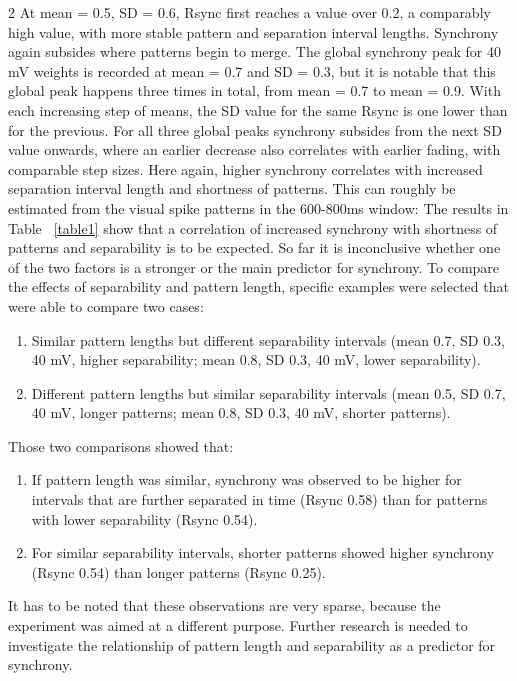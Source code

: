 \documentclass[12pt,a4paper]{article}
\begin{document}
\begin{multicols}{2}
            At mean = 0.5, SD = 0.6, Rsync first reaches a value over 0.2, a comparably high value, with more stable pattern and separation interval lengths. Synchrony again subsides where patterns begin to merge. The global synchrony peak for 40 mV weights is recorded at mean = 0.7 and SD = 0.3, but it is notable that this global peak happens three times in total, from mean = 0.7 to mean = 0.9. With each increasing step of means, the SD value for the same Rsync is one lower than for the previous. For all three global peaks synchrony subsides from the next SD value onwards, where an earlier decrease also correlates with earlier fading, with comparable step sizes. Here again, higher synchrony correlates with increased separation interval length and shortness of patterns. This can roughly be estimated from the visual spike patterns in the 600-800ms window: The results in Table ~\ref{table1} show that a correlation of increased synchrony with shortness of patterns and separability is to be expected. So far it is inconclusive whether one of the two factors is a stronger or the main predictor for synchrony. To compare the effects of separability and pattern length, specific examples were selected that were able to compare two cases:
            \begin{enumerate}[label=(\arabic*), leftmargin=*, rightmargin=1em, itemsep=10pt, parsep=0pt, topsep=10pt, partopsep=0pt]
                \item\label{diffsep} Similar pattern lengths but different separability intervals (mean 0.7, SD 0.3, 40 mV, higher separability; mean 0.8, SD 0.3, 40 mV, lower separability).
                \item\label{diffpattern} Different pattern lengths but similar separability intervals (mean 0.5, SD 0.7, 40 mV, longer patterns; mean 0.8, SD 0.3, 40 mV, shorter patterns).
            \end{enumerate}
            Those two comparisons showed that:
            \begin{enumerate}[label=(\arabic*), leftmargin=*, rightmargin=1em, itemsep=10pt, parsep=0pt, topsep=10pt, partopsep=0pt]
                \item[\ref{diffsep}]If pattern length was similar, synchrony was observed to be higher for intervals that are further separated in time (Rsync 0.58) than for patterns with lower separability (Rsync 0.54).
                \item[\ref{diffpattern}] For similar separability intervals, shorter patterns showed higher synchrony (Rsync 0.54) than longer patterns (Rsync 0.25).
            \end{enumerate}
            It has to be noted that these observations are very sparse, because the experiment was aimed at a different purpose. Further research is needed to investigate the relationship of pattern length and separability as a predictor for synchrony.

    \end{multicols}
        
\end{document}
